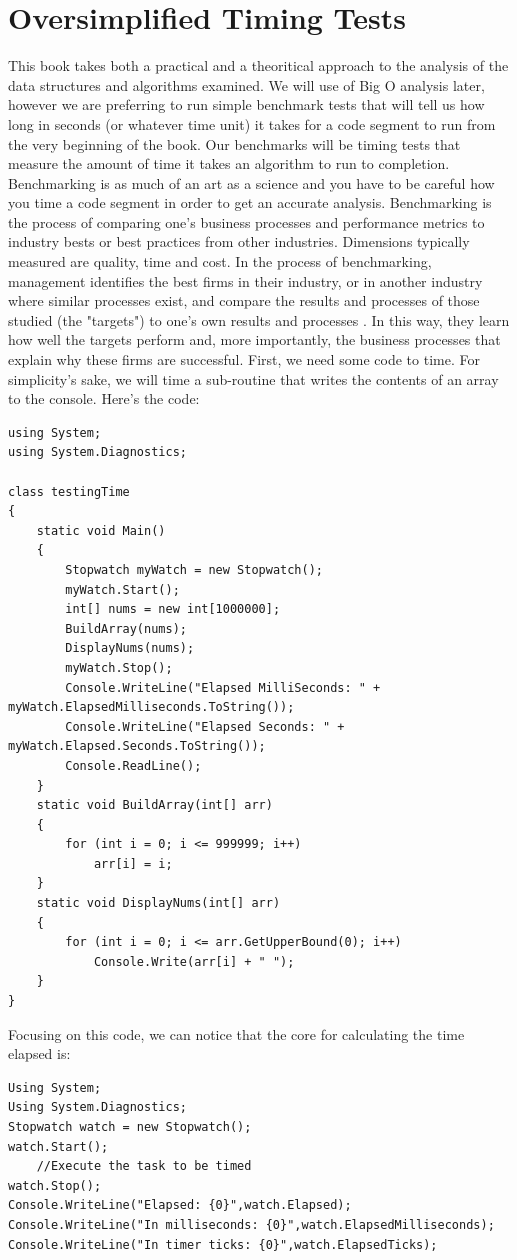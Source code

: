 \documentclass[12pt,a4paper,final,twoside,titlepage]{book}
\begin{document}
\section{Oversimplified Timing Tests}
This book takes both a practical and a theoritical approach to the analysis of the data structures and algorithms examined. We will use of Big O analysis later, however we are preferring  to run simple benchmark tests that will tell us how long in seconds (or whatever time unit) it takes for a code segment to run from the very beginning of the book. Our benchmarks will be timing tests that measure the amount of time it takes an algorithm to run to completion. Benchmarking is as much of an art as a science and you have to be careful how you time a code segment in order to get an accurate analysis. Benchmarking is the process of comparing one's business processes and performance metrics to industry bests or best practices from other industries. Dimensions typically measured are quality, time and cost. In the process of benchmarking, management identifies the best firms in their industry, or in another industry where similar processes exist, and compare the results and processes of those studied (the "targets") to one's own results and processes \cite{benchmarking-wikipedia}. In this way, they learn how well the targets perform and, more importantly, the business processes that explain why these firms are successful.
First, we need some code to time. For simplicity’s sake, we will time a sub-routine that writes the contents of an array to the console. Here’s the code:
\begin{lstlisting}
using System; 
using System.Diagnostics;

class testingTime
{
    static void Main()
    {
        Stopwatch myWatch = new Stopwatch();
        myWatch.Start();
        int[] nums = new int[1000000];
        BuildArray(nums);
        DisplayNums(nums);
        myWatch.Stop();
        Console.WriteLine("Elapsed MilliSeconds: " + myWatch.ElapsedMilliseconds.ToString());
        Console.WriteLine("Elapsed Seconds: " + myWatch.Elapsed.Seconds.ToString());
        Console.ReadLine();
    }
    static void BuildArray(int[] arr)
    {
        for (int i = 0; i <= 999999; i++)
            arr[i] = i;
    }
    static void DisplayNums(int[] arr)
    {
        for (int i = 0; i <= arr.GetUpperBound(0); i++)
            Console.Write(arr[i] + " ");
    }
}
\end{lstlisting}
Focusing on this code, we can notice that the core for calculating the time elapsed is:
\begin{lstlisting}
Using System;
Using System.Diagnostics;
Stopwatch watch = new Stopwatch();
watch.Start();
	//Execute the task to be timed
watch.Stop();
Console.WriteLine("Elapsed: {0}",watch.Elapsed);
Console.WriteLine("In milliseconds: {0}",watch.ElapsedMilliseconds);
Console.WriteLine("In timer ticks: {0}",watch.ElapsedTicks);
\end{lstlisting}
\end{document}

